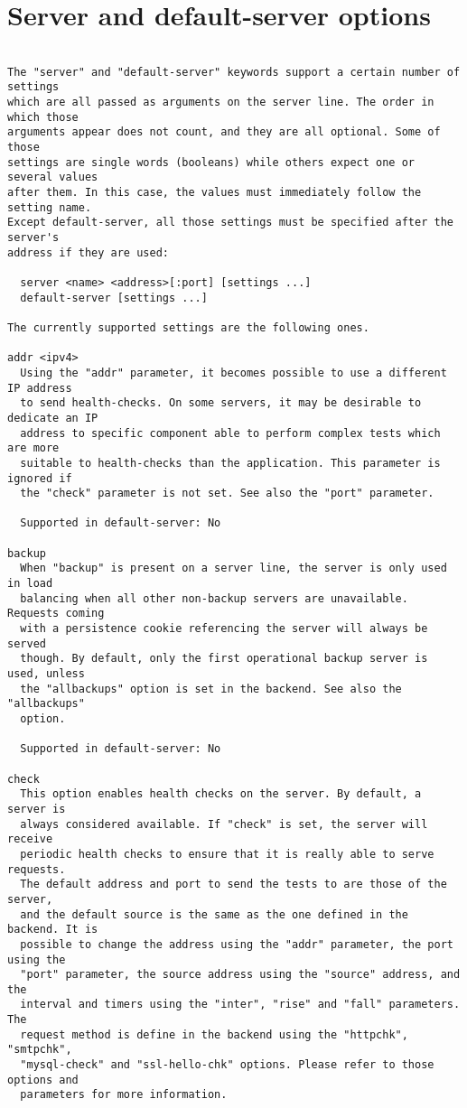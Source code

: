 
\chapter{Server and default-server options}

\begin{verbatim}

The "server" and "default-server" keywords support a certain number of settings
which are all passed as arguments on the server line. The order in which those
arguments appear does not count, and they are all optional. Some of those
settings are single words (booleans) while others expect one or several values
after them. In this case, the values must immediately follow the setting name.
Except default-server, all those settings must be specified after the server's
address if they are used:

  server <name> <address>[:port] [settings ...]
  default-server [settings ...]

The currently supported settings are the following ones.

addr <ipv4>
  Using the "addr" parameter, it becomes possible to use a different IP address
  to send health-checks. On some servers, it may be desirable to dedicate an IP
  address to specific component able to perform complex tests which are more
  suitable to health-checks than the application. This parameter is ignored if
  the "check" parameter is not set. See also the "port" parameter.

  Supported in default-server: No

backup
  When "backup" is present on a server line, the server is only used in load
  balancing when all other non-backup servers are unavailable. Requests coming
  with a persistence cookie referencing the server will always be served
  though. By default, only the first operational backup server is used, unless
  the "allbackups" option is set in the backend. See also the "allbackups"
  option.

  Supported in default-server: No

check
  This option enables health checks on the server. By default, a server is
  always considered available. If "check" is set, the server will receive
  periodic health checks to ensure that it is really able to serve requests.
  The default address and port to send the tests to are those of the server,
  and the default source is the same as the one defined in the backend. It is
  possible to change the address using the "addr" parameter, the port using the
  "port" parameter, the source address using the "source" address, and the
  interval and timers using the "inter", "rise" and "fall" parameters. The
  request method is define in the backend using the "httpchk", "smtpchk",
  "mysql-check" and "ssl-hello-chk" options. Please refer to those options and
  parameters for more information.


\end{verbatim}
